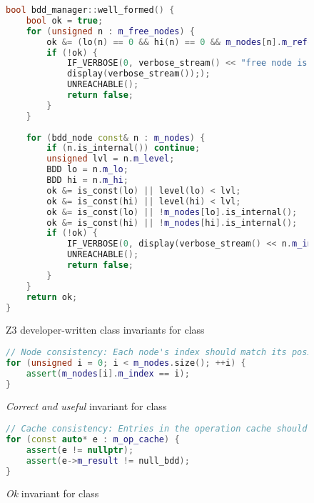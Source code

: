 \begin{figure}[htp]
    \centering
\begin{lstlisting}[language=c++]
bool bdd_manager::well_formed() {
    bool ok = true;
    for (unsigned n : m_free_nodes) {
        ok &= (lo(n) == 0 && hi(n) == 0 && m_nodes[n].m_refcount == 0);
        if (!ok) {
            IF_VERBOSE(0, verbose_stream() << "free node is not internal " << n << " " << lo(n) << " " << hi(n) << " " << m_nodes[n].m_refcount << "\n";
            display(verbose_stream()););
            UNREACHABLE();
            return false;
        }
    }
    
    for (bdd_node const& n : m_nodes) {
        if (n.is_internal()) continue;
        unsigned lvl = n.m_level;
        BDD lo = n.m_lo;
        BDD hi = n.m_hi;
        ok &= is_const(lo) || level(lo) < lvl;
        ok &= is_const(hi) || level(hi) < lvl;
        ok &= is_const(lo) || !m_nodes[lo].is_internal();
        ok &= is_const(hi) || !m_nodes[hi].is_internal();
        if (!ok) {
            IF_VERBOSE(0, display(verbose_stream() << n.m_index << " lo " << lo << " hi " << hi << "\n"););
            UNREACHABLE();
            return false;
        }
    }
    return ok;
}
\end{lstlisting}
    \caption{Z3 developer-written class invariants for  class}
    \label{fig:bdd_well_formed}
\end{figure}

\begin{figure}[htp]
    \centering
\begin{lstlisting}[language=c++]
// Node consistency: Each node's index should match its position in m_nodes
for (unsigned i = 0; i < m_nodes.size(); ++i) {
    assert(m_nodes[i].m_index == i);
}
\end{lstlisting}
    \caption{\textit{Correct and useful} invariant for  class}
    \label{fig:bdd_correct_useful}
\end{figure}

\begin{figure}[htp]
    \centering
\begin{lstlisting}[language=c++]
// Cache consistency: Entries in the operation cache should be valid
for (const auto* e : m_op_cache) {
    assert(e != nullptr);
    assert(e->m_result != null_bdd);
}
\end{lstlisting}
    \caption{\textit{Ok} invariant for  class}
    \label{fig:bdd_ok}
\end{figure}

